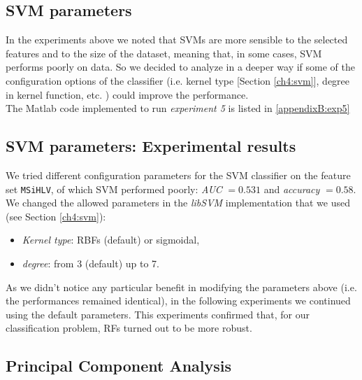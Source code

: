 \subsection{SVM parameters}

In the experiments above we noted that \Glspl{SVM} are more sensible to the selected features and to the size of the dataset, meaning that, in some cases, \Gls{SVM} performs poorly on data.
So we decided to analyze in a deeper way if some of the configuration options of the classifier (i.e. kernel type [Section \ref{ch4:svm}], degree in kernel function, etc. ) could improve the performance.
\\
The Matlab code implemented to run \textit{experiment 5} is listed in \ref{appendixB:exp5}

\vspace{0.5cm}

\subsection{SVM parameters: Experimental results}

We tried different configuration parameters for the \Gls{SVM} classifier on the feature set \texttt{MSiHLV}, of which \Gls{SVM} performed poorly: \textit{AUC} $=0.531$ and
\textit{accuracy} $=0.58$.\\
We changed the allowed parameters in the \textit{libSVM} implementation that we used (see Section \ref{ch4:svm}):

\begin{itemize}
 \item \textit{Kernel type}: \Glspl{RBF} (default) or sigmoidal,
 \item \textit{degree}: from 3 (default) up to 7.
\end{itemize}

As we didn't notice any particular benefit in modifying the parameters above (i.e. the performances remained identical), in the following experiments
we continued using the default parameters. This experiments confirmed that, for our classification problem, \Glspl{RF} turned out to be more robust.


\vspace{0.5cm}


\subsection{Principal Component Analysis}

